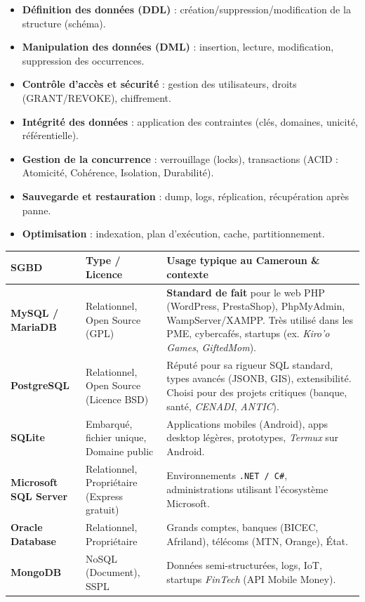 \documentclass[11pt]{article}
\begin{document}
\begin{propriete}
\begin{itemize}
\item \textbf{Définition des données (DDL)} : création/suppression/modification de la structure (schéma).
\item \textbf{Manipulation des données (DML)} : insertion, lecture, modification, suppression des occurrences.
\item \textbf{Contrôle d'accès et sécurité} : gestion des utilisateurs, droits (GRANT/REVOKE), chiffrement.
\item \textbf{Intégrité des données} : application des contraintes (clés, domaines, unicité, référentielle).
\item \textbf{Gestion de la concurrence} : verrouillage (locks), transactions (ACID : Atomicité, Cohérence, Isolation, Durabilité).
\item \textbf{Sauvegarde et restauration} : dump, logs, réplication, récupération après panne.
\item \textbf{Optimisation} : indexation, plan d'exécution, cache, partitionnement.
\end{itemize}
\end{propriete}

\begin{aretenir}
\begin{center}
\begin{tabularx}{\linewidth}{|l|X|X|}\hline
\textbf{SGBD} & \textbf{Type / Licence} & \textbf{Usage typique au Cameroun \& contexte} \\\hline
\textbf{MySQL / MariaDB} & Relationnel, Open Source (GPL) & \textbf{Standard de fait} pour le web PHP (WordPress, PrestaShop), PhpMyAdmin, WampServer/XAMPP. Très utilisé dans les PME, cybercafés, startups (ex. \emph{Kiro'o Games}, \emph{GiftedMom}). \\\hline
\textbf{PostgreSQL} & Relationnel, Open Source (Licence BSD) & Réputé pour sa rigueur SQL standard, types avancés (JSONB, GIS), extensibilité. Choisi pour des projets critiques (banque, santé, \emph{CENADI}, \emph{ANTIC}). \\\hline
\textbf{SQLite} & Embarqué, fichier unique, Domaine public & Applications mobiles (Android), apps desktop légères, prototypes, \emph{Termux} sur Android. \\\hline
\textbf{Microsoft SQL Server} & Relationnel, Propriétaire (Express gratuit) & Environnements \texttt{.NET / C\#}, administrations utilisant l'écosystème Microsoft. \\\hline
\textbf{Oracle Database} & Relationnel, Propriétaire & Grands comptes, banques (BICEC, Afriland), télécoms (MTN, Orange), État. \\\hline
\textbf{MongoDB} & NoSQL (Document), SSPL & Données semi-structurées, logs, IoT, startups \emph{FinTech} (API Mobile Money). \\\hline
\end{tabularx}
\end{center}
\end{aretenir}
\end{document}
